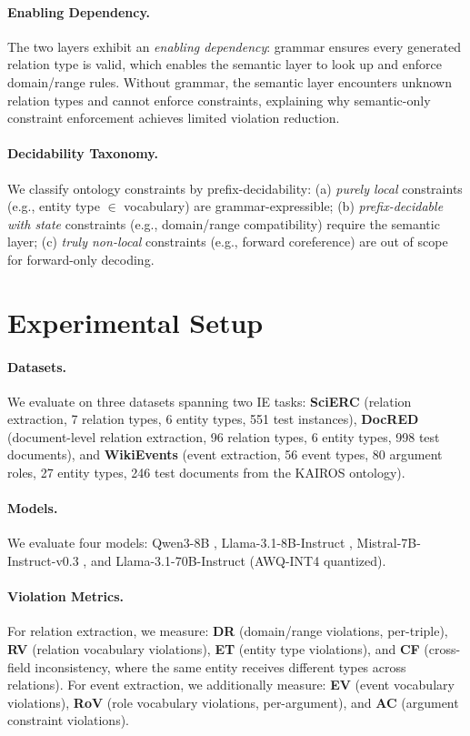 \documentclass[11pt]{article}
\begin{document}
\paragraph{Enabling Dependency.}
The two layers exhibit an \textit{enabling dependency}: grammar ensures every generated relation type is valid, which enables the semantic layer to look up and enforce domain/range rules.
Without grammar, the semantic layer encounters unknown relation types and cannot enforce constraints, explaining why semantic-only constraint enforcement achieves limited violation reduction.

\paragraph{Decidability Taxonomy.}
We classify ontology constraints by prefix-decidability:
(a) \textit{purely local} constraints (e.g., entity type $\in$ vocabulary) are grammar-expressible;
(b) \textit{prefix-decidable with state} constraints (e.g., domain/range compatibility) require the semantic layer;
(c) \textit{truly non-local} constraints (e.g., forward coreference) are out of scope for forward-only decoding.

\section{Experimental Setup}

\paragraph{Datasets.}
We evaluate on three datasets spanning two IE tasks:
\textbf{SciERC} \cite{luan2018multi} (relation extraction, 7 relation types, 6 entity types, 551 test instances),
\textbf{DocRED} \cite{yao2019docred} (document-level relation extraction, 96 relation types, 6 entity types, 998 test documents), and
\textbf{WikiEvents} \cite{li2021document} (event extraction, 56 event types, 80 argument roles, 27 entity types, 246 test documents from the KAIROS ontology).

\paragraph{Models.}
We evaluate four models: Qwen3-8B \cite{yang2025qwen3}, Llama-3.1-8B-Instruct \cite{grattafiori2024llama}, Mistral-7B-Instruct-v0.3 \cite{jiang2023mistral}, and Llama-3.1-70B-Instruct (AWQ-INT4 quantized).

\paragraph{Violation Metrics.}
For relation extraction, we measure:
\textbf{DR} (domain/range violations, per-triple),
\textbf{RV} (relation vocabulary violations),
\textbf{ET} (entity type violations), and
\textbf{CF} (cross-field inconsistency, where the same entity receives different types across relations).
For event extraction, we additionally measure:
\textbf{EV} (event vocabulary violations),
\textbf{RoV} (role vocabulary violations, per-argument), and
\textbf{AC} (argument constraint violations).
\end{document}
